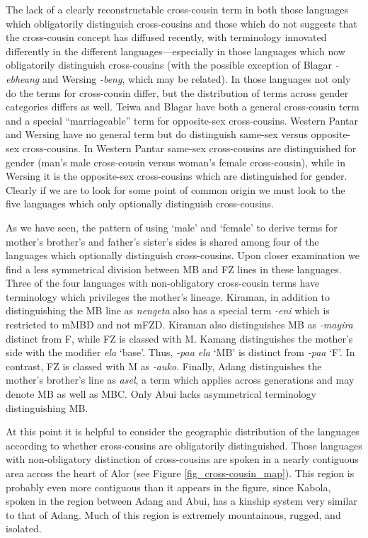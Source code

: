 The lack of a clearly reconstructable cross-cousin term in both those languages which obligatorily distinguish cross-cousins and those which do not suggests that the cross-cousin concept has diffused recently, with terminology innovated differently in the different languages---especially in those languages which now obligatorily distinguish cross-cousins (with the possible exception of Blagar \textit{-ebheang} and Wersing \textit{-beng}, which may be related). In those languages not only do the terms for cross-cousin differ, but the distribution of terms across gender categories differs as well. Teiwa and Blagar have both a general cross-cousin term and a special ``marriageable'' term for opposite-sex cross-cousins. Western Pantar and Wersing have no general term but do distinguish same-sex versus opposite-sex cross-cousins. In Western Pantar same-sex cross-cousins are distinguished for gender (man's male cross-cousin versus woman's female cross-cousin), while in Wersing it is the opposite-sex cross-cousins which are distinguished for gender. Clearly if we are to look for some point of common origin we must look to the five languages which only optionally distinguish cross-cousins.

As we have seen, the pattern of using `male' and `female' to derive terms for mother's brother's and father's sister's sides is shared among four of the languages which optionally distinguish cross-cousins. Upon closer examination we find a less symmetrical division between MB and FZ lines in these languages. Three of the four languages with non-obligatory cross-cousin terms have terminology which privileges the mother's lineage. Kiraman, in addition to distinguishing the MB line as \textit{nengeta} also has a special term \textit{-eni} which is restricted to mMBD and not mFZD. Kiraman also distinguishes MB as \textit{-mayira} distinct from F, while FZ is classed with M. Kamang distinguishes the mother's side with the modifier \textit{ela} `base'. Thus, \textit{-paa ela} `MB' is distinct from \textit{-paa} `F'. In contrast, FZ is classed with M as \textit{-auko}. Finally, Adang distinguishes the mother's brother's line as \textit{asel}, a term which applies across generations and may denote MB as well as MBC. Only Abui lacks asymmetrical terminology distinguishing MB.

At this point it is helpful to consider the geographic distribution of the languages according to whether cross-cousins are obligatorily distinguished. Those languages with non-obligatory distinction of cross-cousins are spoken in a nearly contiguous area across the heart of Alor (see Figure \ref{fig_cross-cousin_map}). This region is probably even more contiguous than it appears in the figure, since Kabola, spoken in the region between Adang and Abui, has a kinship system very similar to that of Adang. Much of this region is extremely mountainous, rugged, and isolated.

